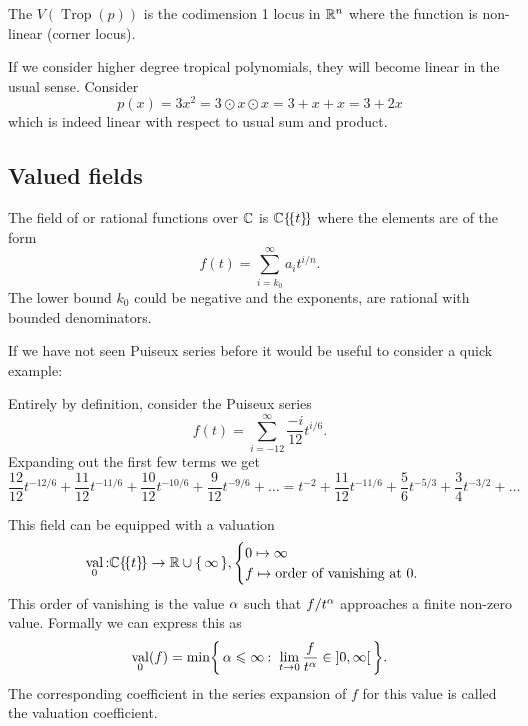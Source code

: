 \documentclass[12pt]{memoir}
\DeclareMathOperator{\val}{val}
\DeclareMathOperator{\Trop}{Trop}
\begin{document}
\begin{Def}
    The  $V(\Trop(p))$ is the codimension 1 locus in $\mathbb{R}^n$ where the function is non-linear (corner locus).
\end{Def}

\begin{Ex}
If we consider higher degree tropical polynomials, they will become linear in the usual sense. Consider 
$$p(x)=3x^2=3\odot x\odot x=3+x+x=3+2x$$
which is indeed linear with respect to usual sum and product.
\end{Ex}

\subsection{Valued fields}

\begin{Def}
The field of  or rational functions over $\mathbb{C}$ is $\mathbb{C}\{\!\{t\}\!\}$ where the elements are of the form 
$$f(t)=\sum_{i=k_0}^\infty a_it^{i/n}.$$
The lower bound $k_0$ could be negative and the exponents, are rational with bounded denominators. 
\end{Def}

If we have not seen Puiseux series before it would be useful to consider a quick example:

\begin{Ex}
    Entirely by definition, consider the Puiseux series 
    $$f(t)=\sum_{i=-12}^\infty \frac{-i}{12}t^{i/6}.$$
    Expanding out the first few terms we get 
    $$\frac{12}{12}t^{-12/6}+\frac{11}{12}t^{-11/6}+\frac{10}{12}t^{-10/6}+\frac{9}{12}t^{-9/6}+\dots=t^{-2}+\frac{11}{12}t^{-11/6}+\frac{5}{6}t^{-5/3}+\frac{3}{4}t^{-3/2}+\dots$$
\end{Ex}
This field can be equipped with a valuation
$$\val_0\: \bC\{\!\{t\}\!\}\to\bR\cup\set{\infty},\begin{cases}
    0\mapsto \infty\\
    f\mapsto\text{order of vanishing at }0.
\end{cases}$$
This order of vanishing is the value $\alpha$ such that $f/t^\alpha$ approaches a finite non-zero value. Formally we can express this as 
$$\val_0(f)=\min\Set{\al\leq\infty\:\ \lim_{t\to0}\frac{f}{t^\al}\in\obonj{0,\infty}}.$$
The corresponding coefficient in the series expansion of $f$ for this value is called the valuation coefficient.
\end{document}
